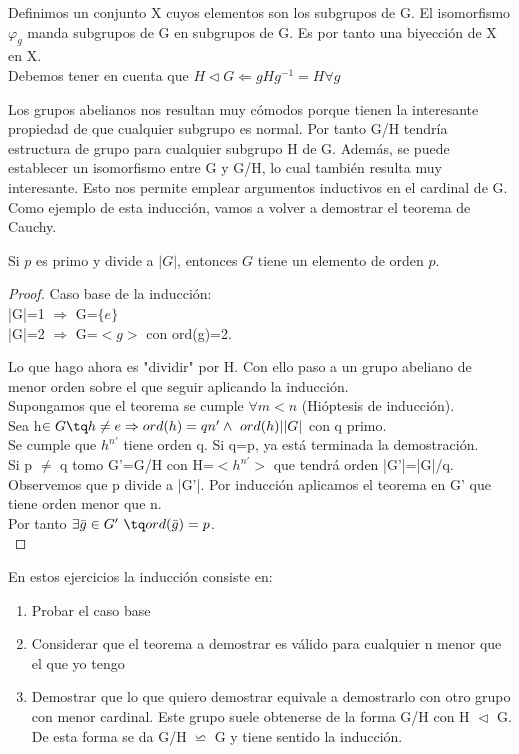 \documentclass[nochap]{apuntes}
\begin{document}
Definimos un conjunto X cuyos elementos son los subgrupos de G. El isomorfismo $\varphi_{g}$  manda subgrupos de G en subgrupos de G.
Es por tanto una biyección de X en X.\\
Debemos tener en cuenta que $H \vartriangleleft G \Leftarrow gHg^{-1}=H \forall g$

Los grupos abelianos nos resultan muy cómodos porque tienen la interesante propiedad de que cualquier subgrupo es normal. Por tanto
G/H tendría estructura de grupo para cualquier subgrupo H de G. Además, se puede establecer un isomorfismo entre G y G/H, lo cual también
resulta muy interesante. Esto nos permite emplear argumentos inductivos en el cardinal de G.\\
Como ejemplo de esta inducción, vamos a volver a demostrar el teorema de Cauchy.
\begin{theorem}\label{thmCauchy}
 Si $p$ es primo y divide a $|G|$, entonces $G$ tiene un elemento de orden $p$.
\end{theorem}
\begin{proof}
 Caso base de la inducción:\\
 |G|=1 $\Rightarrow$ G=$\{e\}$ \\
 |G|=2 $\Rightarrow$  G=$<g>$  con ord(g)=2.

 Lo que hago ahora es "dividir" por H. Con ello paso a un grupo abeliano de menor orden sobre el que seguir aplicando la inducción.\\
 Supongamos que el teorema se cumple $\forall m < n$  (Hióptesis de inducción).\\
 Sea h$\in G \tq h\neq e\Rightarrow ord(h)=qn' \wedge \ ord(h)| |G|$  con q primo.\\
 Se cumple que $h^{n'}$  tiene orden q. Si q=p, ya está terminada la demostración.\\
 Si p $\neq$ q tomo G'=G/H con H=$<h^{n'}>$  que tendrá orden |G'|=|G|/q.\\
 Observemos que p divide a |G'|. Por inducción aplicamos el teorema en G' que tiene orden menor que n.\\
 Por tanto $\exists \bar{g}\in G' \ \tq ord(\bar{g})=p$.\\
\end{proof}

\begin{defn}[Inducción]
 En estos ejercicios la inducción consiste en:
 \begin{enumerate}
  \item Probar el caso base
  \item Considerar que el teorema a demostrar es válido para cualquier n menor que el que yo tengo
  \item Demostrar que lo que quiero demostrar equivale a demostrarlo con otro grupo con menor cardinal. Este grupo suele obtenerse
  de la forma G/H con H $\vartriangleleft$ G. De esta forma se da G/H $\backsimeq$ G y tiene sentido la inducción.
 \end{enumerate}
\end{defn}
\end{document}
